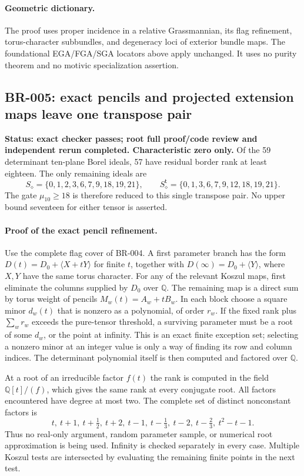 \paragraph{Geometric dictionary.}
The proof uses proper incidence in a relative Grassmannian, its flag
refinement, torus-character subbundles, and degeneracy loci of exterior
bundle maps.  The foundational EGA/FGA/SGA locators above apply unchanged.
It uses no purity theorem and no motivic specialization assertion.

\subsection*{BR-005: exact pencils and projected extension maps leave one transpose pair}
\textbf{Status: exact checker passes; root full proof/code review and independent rerun completed.
Characteristic zero only.}
Of the 59 determinant ten-plane Borel ideals, 57 have residual border
rank at least eighteen.  The only remaining ideals are
\[
 S_\diamond=\{0,1,2,3,6,7,9,18,19,21\},\qquad
 S_\diamond^{\mathsf t}=\{0,1,3,6,7,9,12,18,19,21\}.
\]
The gate $\mu_{10}\ge18$ is therefore reduced to this single transpose
pair.  No upper bound seventeen for either tensor is asserted.

\paragraph{Proof of the exact pencil refinement.}
Use the complete flag cover of BR-004.  A first parameter branch has
the form $D(t)=D_0+\langle X+tY\rangle$ for finite $t$, together
with $D(\infty)=D_0+\langle Y\rangle$, where $X,Y$ have the same
torus character.  For any of the relevant Koszul maps, first eliminate
the columns supplied by $D_0$ over $\mathbb Q$.  The remaining map
is a direct sum by torus weight of pencils $M_w(t)=A_w+tB_w$.
In each block choose a square minor $d_w(t)$ that is nonzero as a
polynomial, of order $r_w$.  If the fixed rank plus $\sum_w r_w$
exceeds the pure-tensor threshold, a surviving parameter must be a root
of some $d_w$, or the point at infinity.  This is an exact finite
exception set; selecting a nonzero minor at an integer value is only
a way of finding its row and column indices.  The determinant polynomial
itself is then computed and factored over $\mathbb Q$.

At a root of an irreducible factor $f(t)$ the rank is computed in the
field $\mathbb Q[t]/(f)$, which gives the same rank at every conjugate
root.  All factors encountered have degree at most two.  The complete
set of distinct nonconstant factors is
\[
 t,\ t+1,\ t+\tfrac12,\ t+2,\ t-1,\ t-\tfrac13,
 \ t-2,\ t-\tfrac23,\ t^2-t-1.
\]
Thus no real-only argument, random parameter sample, or numerical root
approximation is being used.  Infinity is checked separately in every
case.  Multiple Koszul tests are intersected by evaluating the remaining
finite points in the next test.

